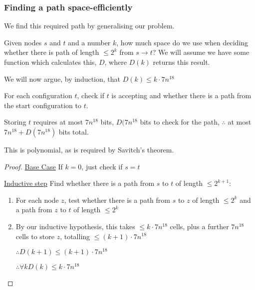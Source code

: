 \documentclass{beamer}
\begin{document}
 \begin{frame}[allowframebreaks]
   \frametitle{Finding a path space-efficiently}
   We find this required path by generalising our problem.

   Given nodes $s$ and $t$ and a number $k$, how much space do we use when deciding whether there is path of length $\leq 2^{k}$ from $s\rightarrow t$? We will assume we have some function which calculates this, $D$, where $D(k)$ returns this result.

   We will now argue, by induction, that $D(k) \leq k \cdot 7n^{18}$

   For each configuration $t$, check if $t$ is accepting and whether there is a path from the start configuration to $t$.

   Storing $t$ requires at most $7n^{18}$ bits, $D(7n^{18}$ bits to check for the path, $\therefore$ at most $7n^{18} + D(7n^{18})$ bits total.

   This is polynomial, as is required by Savitch's theorem.

   \framebreak{}

   \begin{proof}
     \underline{Base Case} If $k =0$, just check if $s=t$

     \underline{Inductive step} Find whether there is a path from $s$ to $t$ of length $\leq 2^{k+1}$:

     \begin{enumerate}
       \item For each node $z$, test whether there is a path from $s$ to $z$ of length $\leq 2^{k}$ and a path from $z$ to $t$ of length $\leq 2^{k}$
       \item By our inductive hypothesis, this takes $\leq k \cdot 7n^{18}$ cells, plus a further $7n^{18}$ cells to store $z$, totalling $\leq (k+1) \cdot 7n^{18}$

             $\therefore D(k+1) \leq (k+1) \cdot 7n^{18}$

             $\therefore \forall k D(k) \leq k \cdot 7n^{18}$
     \end{enumerate}


   \end{proof}


 \end{frame}
\end{document}
